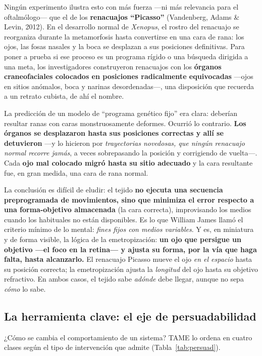 \documentclass[11pt,a4paper]{article}
\begin{document}
Ningún experimento ilustra esto con más fuerza ---ni más relevancia para el oftalmólogo--- que el de los \textbf{renacuajos \enquote{Picasso}} (Vandenberg, Adams \& Levin, 2012). En el desarrollo normal de \emph{Xenopus}, el rostro del renacuajo se reorganiza durante la metamorfosis hasta convertirse en una cara de rana: los ojos, las fosas nasales y la boca se desplazan a sus posiciones definitivas. Para poner a prueba si ese proceso es un programa rígido o una búsqueda dirigida a una meta, los investigadores construyeron renacuajos con los \textbf{órganos craneofaciales colocados en posiciones radicalmente equivocadas} ---ojos en sitios anómalos, boca y narinas desordenadas---, una disposición que recuerda a un retrato cubista, de ahí el nombre.

La predicción de un modelo de \enquote{programa genético fijo} era clara: deberían resultar ranas con caras monstruosamente deformes. Ocurrió lo contrario. \textbf{Los órganos se desplazaron hasta sus posiciones correctas y allí se detuvieron} ---y lo hicieron por \emph{trayectorias novedosas, que ningún renacuajo normal recorre jamás}, a veces sobrepasando la posición y corrigiendo de vuelta---. Cada \textbf{ojo mal colocado migró hasta su sitio adecuado} y la cara resultante fue, en gran medida, una cara de rana normal.

La conclusión es difícil de eludir: el tejido \textbf{no ejecuta una secuencia preprogramada de movimientos, sino que minimiza el error respecto a una forma-objetivo almacenada} (la cara correcta), improvisando los medios cuando los habituales no están disponibles. Es lo que William James llamó el criterio mínimo de lo mental: \emph{fines fijos con medios variables}. Y es, en miniatura y de forma visible, la lógica de la emetropización: \textbf{un ojo que persigue un objetivo ---el foco en la retina--- y ajusta su forma, por la vía que haga falta, hasta alcanzarlo.} El renacuajo Picasso mueve el ojo \emph{en el espacio} hasta su posición correcta; la emetropización ajusta la \emph{longitud} del ojo hasta su objetivo refractivo. En ambos casos, el tejido sabe \emph{adónde} debe llegar, aunque no sepa \emph{cómo} lo sabe.

\subsection{La herramienta clave: el eje de persuadabilidad}

¿Cómo se cambia el comportamiento de un sistema? TAME lo ordena en cuatro clases según el tipo de intervención que admite (Tabla~\ref{tab:persuad}).
\end{document}
